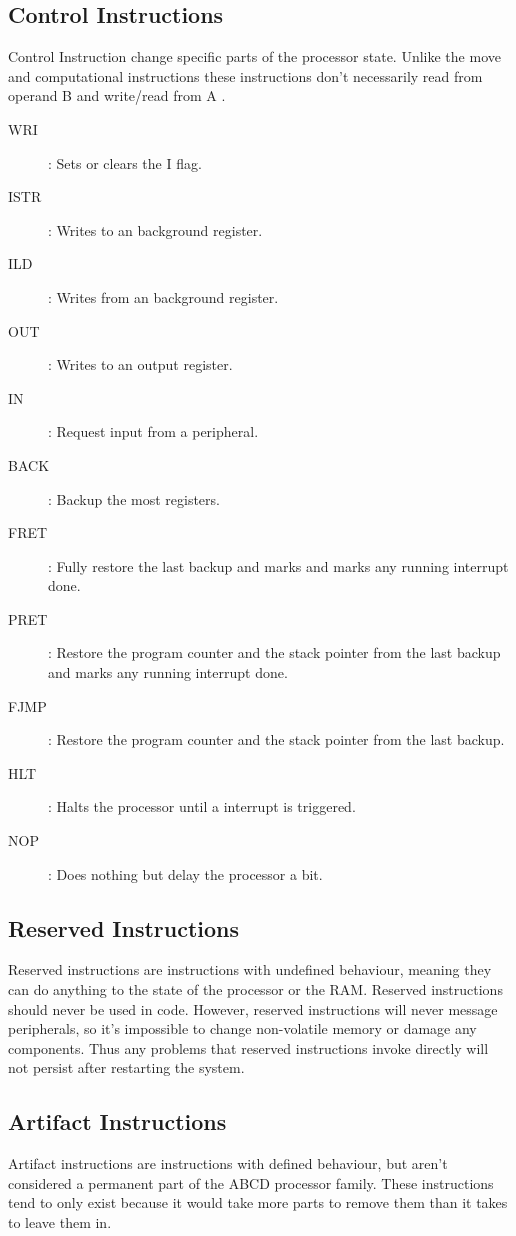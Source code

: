 \documentclass[oneside, a4paper]{memoir}
\begin{document}
\subsection{Control Instructions}
Control Instruction change specific parts of the processor state. Unlike the move and computational instructions these instructions don't necessarily read from operand B and write/read from A .
\begin{description}
\item[WRI]: Sets or clears the I flag.
\item[ISTR]: Writes to an background register.
\item[ILD]: Writes from an background register.
\item[OUT]: Writes to an output register.
\item[IN]: Request input from a peripheral.
\item[BACK]: Backup the most registers.
\item[FRET]: Fully restore the last backup and marks and marks any running interrupt done.
\item[PRET]: Restore the program counter and the stack pointer from the last backup and marks any running interrupt done.
\item[FJMP]: Restore the program counter and the stack pointer from the last backup.
\item[HLT]: Halts the processor until a interrupt is triggered.
\item[NOP]: Does nothing but delay the processor a bit.
\end{description}
\subsection{Reserved Instructions}
Reserved instructions are instructions with undefined behaviour, meaning they can do anything to the state of the processor or the RAM. Reserved instructions should never be used in code. However, reserved instructions will never message peripherals, so it's impossible to change non-volatile memory or damage any components. Thus any problems that reserved instructions invoke directly will not persist after restarting the system. 
\subsection{Artifact Instructions}
Artifact instructions are instructions with defined behaviour, but aren't considered a permanent part of the ABCD processor family. These instructions tend to only exist because it would take more parts to remove them than it takes to leave them in.
\end{document}

